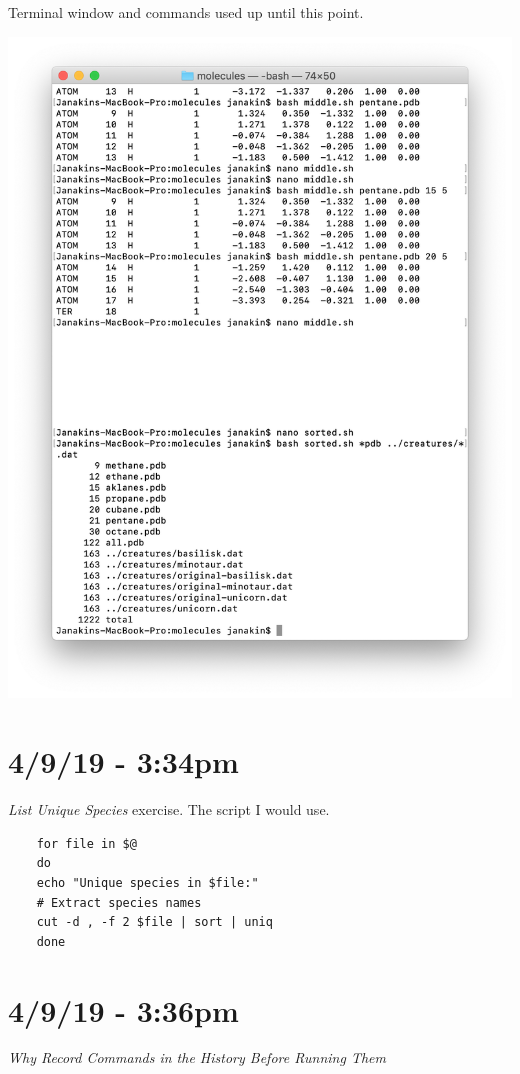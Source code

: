 \documentclass{article}
\begin{document}
Terminal window and commands used up until this point.

\includegraphics[width=\textwidth]{figx.png}

\section*{4/9/19 - 3:34pm}

\textit{List Unique Species} exercise. The script I would use.

\begin{verbatim}
    for file in $@
    do
	echo "Unique species in $file:"
	# Extract species names
	cut -d , -f 2 $file | sort | uniq
    done
\end{verbatim}

\section*{4/9/19 - 3:36pm}

\textit{Why Record Commands in the History Before Running Them}
\end{document}
